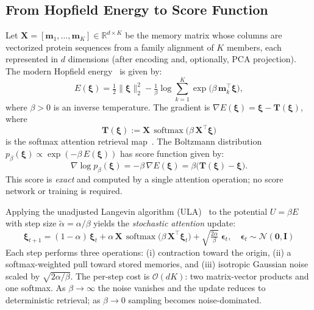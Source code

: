 
\subsection{From Hopfield Energy to Score Function}
Let $\mathbf{X} = [\mathbf{m}_1, \dots, \mathbf{m}_K] \in \mathbb{R}^{d \times K}$ be the memory matrix whose columns are vectorized protein sequences from a family alignment of $K$ members, each represented in $d$ dimensions (after encoding and, optionally, PCA projection). The modern Hopfield energy~\cite{ramsauerHopfieldNetworksAll2021} is given by:
\begin{equation}\label{eq:hopfield-energy}
    E(\boldsymbol{\xi}) = \tfrac{1}{2}\|\boldsymbol{\xi}\|_2^2 - \tfrac{1}{\beta}\log\sum_{k=1}^{K} \exp\!\bigl(\beta\,\mathbf{m}_k^\top \boldsymbol{\xi}\bigr),
\end{equation}
where $\beta > 0$ is an inverse temperature. The gradient is $\nabla E(\boldsymbol{\xi}) = \boldsymbol{\xi} - \mathbf{T}(\boldsymbol{\xi})$, where
\begin{equation}\label{eq:retrieval-map}
    \mathbf{T}(\boldsymbol{\xi}) := \mathbf{X}\,\operatorname{softmax}\!\bigl(\beta\,\mathbf{X}^\top\boldsymbol{\xi}\bigr)
\end{equation}
is the softmax attention retrieval map~\cite{ramsauerHopfieldNetworksAll2021}. The Boltzmann distribution~\cite{ackeleyLearningAlgorithmBoltzmann1985} $p_\beta(\boldsymbol{\xi}) \propto \exp(-\beta\,E(\boldsymbol{\xi}))$ has score function given by:
\begin{equation}\label{eq:score}
    \nabla \log p_\beta(\boldsymbol{\xi}) = -\beta\,\nabla E(\boldsymbol{\xi}) = \beta\bigl(\mathbf{T}(\boldsymbol{\xi}) - \boldsymbol{\xi}\bigr).
\end{equation}
This score is \emph{exact} and computed by a single attention operation; no score network or training is required.

Applying the unadjusted Langevin algorithm (ULA)~\cite{robertsTweedieExponentialConvergence1996} to the potential $U = \beta E$ with step size $\tilde{\alpha} = \alpha/\beta$ yields the \emph{stochastic attention} update:
\begin{equation}\label{eq:sa-update}
    \boxed{\;
    \boldsymbol{\xi}_{t+1} = (1 - \alpha)\,\boldsymbol{\xi}_t + \alpha\,\mathbf{X}\,\operatorname{softmax}\!\bigl(\beta\,\mathbf{X}^\top\boldsymbol{\xi}_t\bigr) + \sqrt{\tfrac{2\alpha}{\beta}}\;\boldsymbol{\epsilon}_t, \quad \boldsymbol{\epsilon}_t \sim \mathcal{N}(\mathbf{0}, \mathbf{I})
    \;}
\end{equation}
Each step performs three operations: (i) contraction toward the origin, (ii) a softmax-weighted pull toward stored memories, and (iii) isotropic Gaussian noise scaled by $\sqrt{2\alpha/\beta}$. The per-step cost is $\mathcal{O}(dK)$: two matrix-vector products and one softmax. As $\beta \to \infty$ the noise vanishes and the update reduces to deterministic retrieval; as $\beta \to 0$ sampling becomes noise-dominated.

